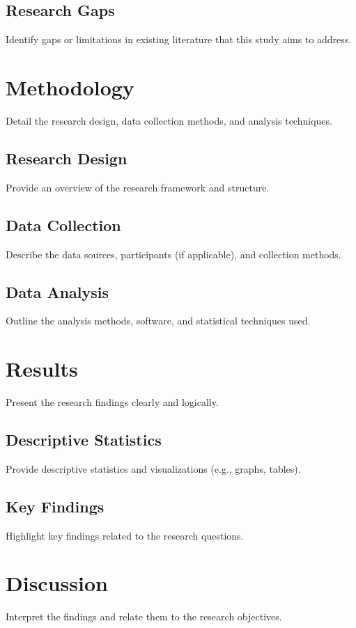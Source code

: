 \documentclass[12pt, a4paper]{report}
\begin{document}
\section{Research Gaps}
Identify gaps or limitations in existing literature that this study aims to address.

\chapter{Methodology}
Detail the research design, data collection methods, and analysis techniques.
\section{Research Design}
Provide an overview of the research framework and structure.

\section{Data Collection}
Describe the data sources, participants (if applicable), and collection methods.

\section{Data Analysis}
Outline the analysis methods, software, and statistical techniques used.

\chapter{Results}
Present the research findings clearly and logically.
\section{Descriptive Statistics}
Provide descriptive statistics and visualizations (e.g., graphs, tables).

\section{Key Findings}
Highlight key findings related to the research questions.

\chapter{Discussion}
Interpret the findings and relate them to the research objectives.
\end{document}
